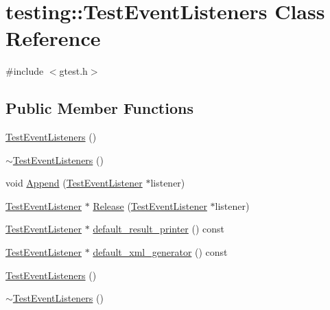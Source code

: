 \hypertarget{classtesting_1_1_test_event_listeners}{}\section{testing\+::Test\+Event\+Listeners Class Reference}
\label{classtesting_1_1_test_event_listeners}


{\ttfamily \#include $<$gtest.\+h$>$}

\subsection*{Public Member Functions}
\begin{DoxyCompactItemize}
\item 
\mbox{\hyperlink{classtesting_1_1_test_event_listeners_af0716e4067a6f357ee5ea18802a591dd}{Test\+Event\+Listeners}} ()
\item 
\mbox{\hyperlink{classtesting_1_1_test_event_listeners_abe9fbbbedf7f55fa898abfae60aa4913}{$\sim$\+Test\+Event\+Listeners}} ()
\item 
void \mbox{\hyperlink{classtesting_1_1_test_event_listeners_a1207dce74d64c1c39ffa6105560536a0}{Append}} (\mbox{\hyperlink{classtesting_1_1_test_event_listener}{Test\+Event\+Listener}} $\ast$listener)
\item 
\mbox{\hyperlink{classtesting_1_1_test_event_listener}{Test\+Event\+Listener}} $\ast$ \mbox{\hyperlink{classtesting_1_1_test_event_listeners_a038c9fa1975f84d6f3d25b52bc7bccdd}{Release}} (\mbox{\hyperlink{classtesting_1_1_test_event_listener}{Test\+Event\+Listener}} $\ast$listener)
\item 
\mbox{\hyperlink{classtesting_1_1_test_event_listener}{Test\+Event\+Listener}} $\ast$ \mbox{\hyperlink{classtesting_1_1_test_event_listeners_a6293443acb5af942eeec638b6aa6dcf2}{default\+\_\+result\+\_\+printer}} () const
\item 
\mbox{\hyperlink{classtesting_1_1_test_event_listener}{Test\+Event\+Listener}} $\ast$ \mbox{\hyperlink{classtesting_1_1_test_event_listeners_aa880de6ddfc3f5824371853c6846abbd}{default\+\_\+xml\+\_\+generator}} () const
\item 
\mbox{\hyperlink{classtesting_1_1_test_event_listeners_af0716e4067a6f357ee5ea18802a591dd}{Test\+Event\+Listeners}} ()
\item 
\mbox{\hyperlink{classtesting_1_1_test_event_listeners_abe9fbbbedf7f55fa898abfae60aa4913}{$\sim$\+Test\+Event\+Listeners}} ()
\item 

\end{DoxyCompactItemize}
